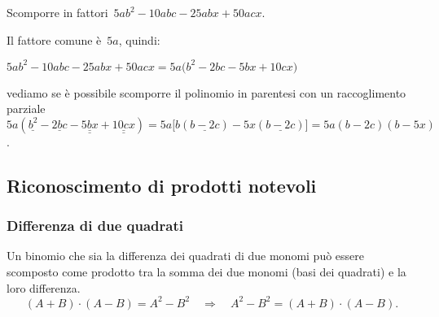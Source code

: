 \begin{exrig}
 \begin{esempio}
Scomporre in fattori~$5ab^{2}-10abc-25abx+50acx$.
 \begin{enumeratea}
  \item Il fattore comune è~$5a$, quindi:
    \begin{itemize*}
    \item $5ab^{2}-10abc-25abx+50acx=5a\bigl(b^{2}-2bc-5bx+10cx\bigr)$
    \end{itemize*}
  \item vediamo se è possibile scomporre il polinomio in parentesi con un 
   raccoglimento parziale~$5a(\underline{b^{2}}-\underline{2bc}
     -\underline{\underline{5bx}}+\underline{\underline{10cx}})=
     5a\bigl[b(\underline{b-2c})-5x(\underline{b-2c})\bigr]=5a(b-2c)(b-5x)$.
 \end{enumeratea}
 \end{esempio}
\end{exrig}

% 


\subsection{Riconoscimento di prodotti notevoli}
\label{subsec:divpol_prodnot}

\subsubsection{Differenza di due quadrati}
\label{subsubsec:divpol_difquad}

Un binomio che sia la differenza dei quadrati di due monomi può essere 
scomposto come prodotto tra la somma dei due monomi (basi dei quadrati) e 
la loro differenza.
\begin{equation*}
(A+B)\cdot (A-B)=
A^{2}-B^{2}\quad \Rightarrow \quad A^{2}-B^{2}=(A+B)\cdot (A-B).
\end{equation*}


